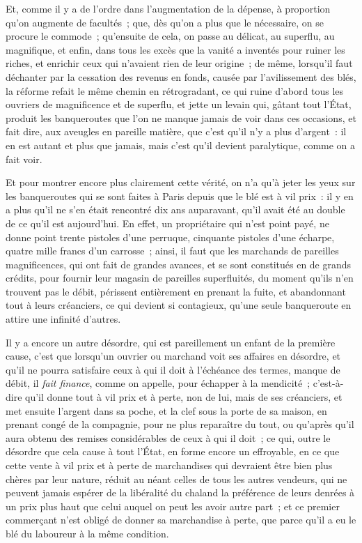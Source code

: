 \documentclass[french,twoside]{book} %
\begin{document}
Et, comme il y a de l’ordre dans l’augmentation de la dépense, à proportion qu’on augmente de facultés ; que, dès qu’on a plus que le nécessaire, on se procure le commode ; qu’ensuite de cela, on passe au délicat, au superflu, au magnifique, et enfin, dans tous les excès que la vanité a inventés pour ruiner les riches, et enrichir ceux qui n’avaient rien de leur origine ; de même, lorsqu’il faut déchanter par la cessation des revenus en fonds, causée par l’avilissement des blés, la réforme refait le même chemin en rétrogradant, ce qui ruine d’abord tous les ouvriers de magnificence et de superflu, et jette un levain qui, gâtant tout l’État, produit les banqueroutes que l’on ne manque jamais de voir dans ces occasions, et fait dire, aux aveugles en pareille matière, que c’est qu’il n’y a plus d’argent : il en est autant et plus que jamais, mais c’est qu’il devient paralytique, comme on a fait voir.\par
Et pour montrer encore plus clairement cette vérité, on n’a qu’à jeter les yeux sur les banqueroutes qui se sont faites à Paris depuis que le blé est à vil prix : il y en a plus qu’il ne s’en était rencontré dix ans auparavant, qu’il avait été au double de ce qu’il est aujourd’hui. En effet, un propriétaire qui n’est point payé, ne donne point trente pistoles d’une perruque, cinquante pistoles d’une écharpe, quatre mille francs d’un carrosse ; ainsi, il faut que les marchands de pareilles magnificences, qui ont fait de grandes avances, et se sont constitués en de grands crédits, pour fournir leur magasin de pareilles superfluités, du moment qu’ils n’en trouvent pas le débit, périssent entièrement en prenant la fuite, et abandonnant tout à leurs créanciers, ce qui devient si contagieux, qu’une seule banqueroute en attire une infinité d’autres.\par
Il y a encore un autre désordre, qui est pareillement un enfant de la première cause, c’est que lorsqu’un ouvrier ou marchand voit ses affaires en désordre, et qu’il ne pourra satisfaire ceux à qui il doit à l’échéance des termes, manque de débit, il {\itshape fait finance}, comme on appelle, pour échapper à la mendicité ; c’est-à-dire qu’il donne tout à vil prix et à perte, non de lui, mais de ses créanciers, et met ensuite l’argent dans sa poche, et la clef sous la porte de sa maison, en prenant congé de la compagnie, pour ne plus reparaître du tout, ou qu’après qu’il aura obtenu des remises considérables de ceux à qui il doit ; ce qui, outre le désordre que cela cause à tout l’État, en forme encore un effroyable, en ce que cette vente à vil prix et à perte de marchandises qui devraient être bien plus chères par leur nature, réduit au néant celles de tous les autres vendeurs, qui ne peuvent jamais espérer de la libéralité du chaland la préférence de leurs denrées à un prix plus haut que celui auquel on peut les avoir autre part ; et ce premier commerçant n’est obligé de donner sa marchandise à perte, que parce qu’il a eu le blé du laboureur à la même condition.
\end{document}
